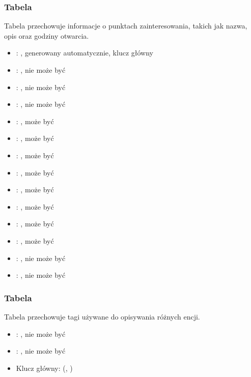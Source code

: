 \subsubsection{Tabela }
Tabela przechowuje informacje o punktach zainteresowania, takich jak nazwa, opis oraz godziny otwarcia.
\begin{itemize}
    \item {}: , generowany automatycznie, klucz główny
    \item {}: , nie może być 
    \item {}: , nie może być 
    \item {}: , nie może być 
    \item {}: , może być 
    \item {}: , może być 
    \item {}: , może być 
    \item {}: , może być 
    \item {}: , może być 
    \item {}: , może być 
    \item {}: , może być 
    \item {}: , może być 
    \item {}: , nie może być 
    \item {}: , nie może być 
\end{itemize}

\subsubsection{Tabela }
Tabela przechowuje tagi używane do opisywania różnych encji.
\begin{itemize}
    \item {}: , nie może być 
    \item {}: , nie może być 
    \item Klucz główny: (, )
\end{itemize}

